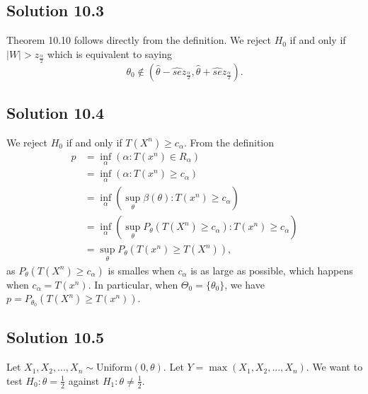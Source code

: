 \subsection*{Solution 10.3}

Theorem 10.10 follows directly from the definition.
We reject $H_0$ if and only if $|W| > z_{\frac{\alpha}{2}}$ which is equivalent to saying
\begin{equation*}
    \theta_0 \notin (\hat{\theta} - \hat{se} z_{\frac{\alpha}{2}}, \hat{\theta} + \hat{se} z_{\frac{\alpha}{2}}).
\end{equation*}


\subsection*{Solution 10.4}

We reject $H_0$ if and only if $T(X^n) \geq c_{\alpha}$.
From the definition
\begin{equation*}
    \begin{split}
        p &= \inf_{\alpha}(\alpha : T(x^n) \in R_{\alpha}) \\
            &= \inf_{\alpha}(\alpha : T(x^n) \geq c_{\alpha}) \\
            &= \inf_{\alpha}(\sup_{\theta} \beta(\theta) : T(x^n) \geq c_{\alpha}) \\
            &= \inf_{\alpha}(\sup_{\theta} P_{\theta}(T(X^n) \geq c_{\alpha}) : T(x^n) \geq c_{\alpha}) \\
            &= \sup_{\theta} P_{\theta}(T(x^n) \geq T(X^n)),
    \end{split}
\end{equation*}
as $P_{\theta}(T(X^n) \geq c_{\alpha})$ is smalles when $c_{\alpha}$ is as large as possible, which happens when $c_{\alpha} = T(x^n)$.
In particular, when $\Theta_0 = \{\theta_0\}$, we have $p = P_{\theta_0}(T(X^n) \geq T(x^n))$.


\subsection*{Solution 10.5}

Let $X_1, X_2, ..., X_n \sim \mathrm{Uniform}(0, \theta)$.
Let $Y = \max(X_1, X_2, ..., X_n)$.
We want to test $H_0: \theta = \frac{1}{2}$ against $H_1: \theta \neq \frac{1}{2}$.

